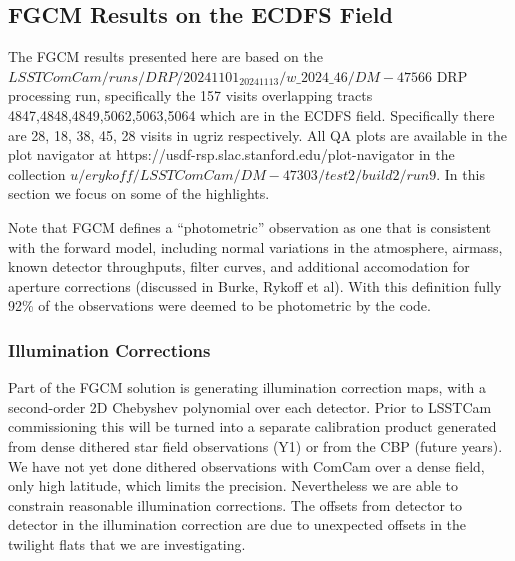 \subsection{FGCM Results on the ECDFS Field}

The FGCM results presented here are based on the
$LSSTComCam/runs/DRP/20241101_20241113/w\_2024\_46/DM-47566$ DRP processing
run, specifically the 157 visits overlapping tracts
4847,4848,4849,5062,5063,5064 which are in the ECDFS field. Specifically there
are 28, 18, 38, 45, 28 visits in ugriz respectively. All QA plots are available
in the plot navigator at https://usdf-rsp.slac.stanford.edu/plot-navigator in
the collection $u/erykoff/LSSTComCam/DM-47303/test2/build2/run9$.  In this
section we focus on some of the highlights.

Note that FGCM defines a ``photometric'' observation as one that is consistent
with the forward model, including normal variations in the atmosphere, airmass,
known detector throughputs, filter curves, and additional accomodation for
aperture corrections (discussed in Burke, Rykoff et al).  With this definition
fully 92\% of the observations were deemed to be photometric by the code.

\subsubsection{Illumination Corrections}

Part of the FGCM solution is generating illumination correction maps, with a
second-order 2D Chebyshev polynomial over each detector.  Prior to LSSTCam
commissioning this will be turned into a separate calibration product generated
from dense dithered star field observations (Y1) or from the CBP (future
years). We have not yet done dithered observations with ComCam over a dense
field, only high latitude, which limits the precision.  Nevertheless we are
able to constrain reasonable illumination corrections.  The offsets from
detector to detector in the illumination correction are due to unexpected
offsets in the twilight flats that we are investigating.

